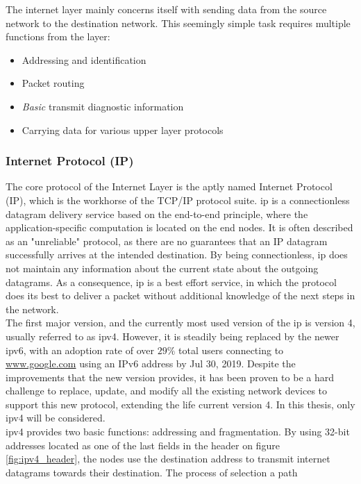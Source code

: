 The internet layer mainly concerns itself with sending data from the source
network to the destination network. This seemingly simple task requires multiple
functions from the layer:
\begin{itemize}
    \item Addressing and identification
    \item Packet routing
    \item \emph{Basic} transmit diagnostic information
    \item Carrying data for various upper layer protocols
\end{itemize}

\subsubsection{Internet Protocol (IP)}
The core protocol of the Internet Layer is the aptly named Internet Protocol
(IP), which is the workhorse of the TCP/IP protocol suite.
\gls{ip} is a connectionless datagram delivery service based on the
end-to-end principle, where the application-specific computation is located on
the end nodes. It is often described as an "unreliable" protocol, as there are
no guarantees that an IP datagram successfully arrives at the intended
destination. By being connectionless, \gls{ip} does not maintain any
information about the current state about the outgoing datagrams.
As a consequence, \gls{ip} is a best effort service, in which the protocol does
its best to deliver a packet without additional knowledge of the next steps in
the network\cite{tcpip_illustrated_vol1}.\\
The first major version, and the currently most used version of the \gls{ip}
is version 4, usually referred to as \gls{ipv4}. However, it is steadily
being replaced by the newer \gls{ipv6}, with an adoption rate of over $29\%$
total users connecting to \url{www.google.com} using an IPv6 address by Jul
30, 2019\cite{google_ipv6_adoption}. Despite the improvements that the new
version provides, it has been proven to be a hard challenge to replace, update,
and modify all the existing network devices to support this new protocol,
extending the life current version 4. In this thesis, only \gls{ipv4} will
be considered.\\
\gls{ipv4} provides two basic functions: addressing and fragmentation. By using
32-bit addresses located as one of the last fields in the header on figure
\ref{fig:ipv4_header}, the nodes use the destination address to transmit
internet datagrams towards their destination. The process of selection a path
